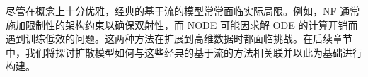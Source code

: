 尽管在概念上十分优雅，经典的基于流的模型常常面临实际局限。例如，NF 通常施加限制性的架构约束以确保双射性，而 NODE 可能因求解 ODE 的计算开销而遇到训练低效的问题。这两种方法在扩展到高维数据时都面临挑战。在后续章节中，我们将探讨扩散模型如何与这些经典的基于流的方法相关联并以此为基础进行构建。











